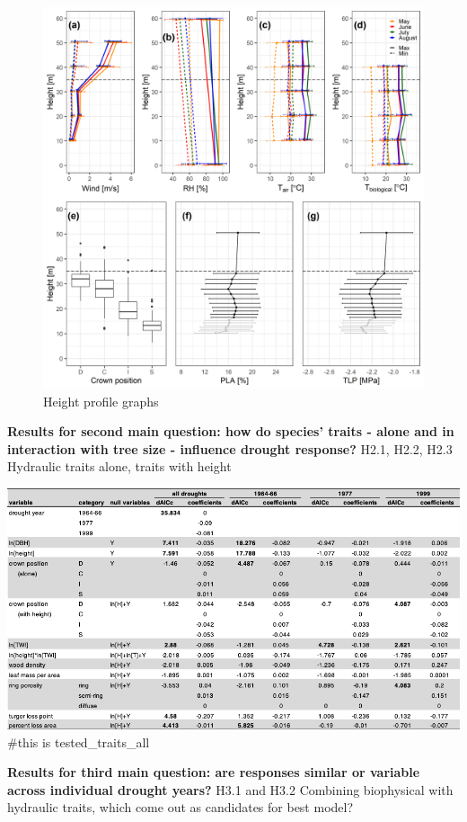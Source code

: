 \documentclass[]{article}
\begin{document}
\begin{figure}[htbp]
\centering
\includegraphics[width=5.20833in]{tables_figures/Figure2.png}
\caption{Height profile graphs}
\end{figure}

\textbf{Results for second main question: how do species' traits - alone
and in interaction with tree size - influence drought response? } H2.1,
H2.2, H2.3 Hydraulic traits alone, traits with height

\includegraphics{tables_figures/Table4.png} \#this is
tested\_traits\_all

\textbf{Results for third main question: are responses similar or
variable across individual drought years?} H3.1 and H3.2 Combining
biophysical with hydraulic traits, which come out as candidates for best
model?
\end{document}
